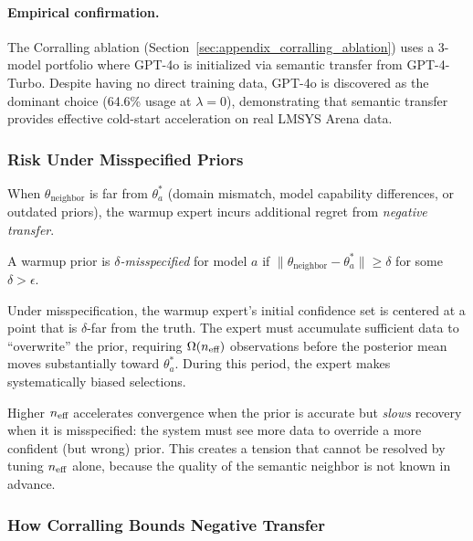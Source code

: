\paragraph{Empirical confirmation.}
The Corralling ablation (Section~\ref{sec:appendix_corralling_ablation}) uses
a 3-model portfolio where GPT-4o is initialized via semantic transfer from
GPT-4-Turbo.  Despite having no direct training data, GPT-4o is discovered as
the dominant choice (64.6\% usage at $\lambda=0$), demonstrating that semantic
transfer provides effective cold-start acceleration on real LMSYS Arena data.

\subsubsection{Risk Under Misspecified Priors}

When $\theta_{\text{neighbor}}$ is far from $\theta_a^*$ (domain mismatch,
model capability differences, or outdated priors), the warmup expert incurs
additional regret from \emph{negative transfer}.

\begin{definition}
\label{def:misspecification}
A warmup prior is \emph{$\delta$-misspecified} for model $a$ if
$\|\theta_{\text{neighbor}} - \theta_a^*\| \geq \delta$ for some $\delta > \epsilon$.
\end{definition}

Under misspecification, the warmup expert's initial confidence set is centered
at a point that is $\delta$-far from the truth.  The expert must accumulate
sufficient data to ``overwrite'' the prior, requiring $\Omega(n_{\text{eff}})$
observations before the posterior mean moves substantially toward $\theta_a^*$.
During this period, the expert makes systematically biased selections.

\begin{remark}
\label{remark:neff_dilemma}
Higher $n_{\text{eff}}$ accelerates convergence when the prior is accurate but
\emph{slows} recovery when it is misspecified: the system must see more data to
override a more confident (but wrong) prior.  This creates a tension that
cannot be resolved by tuning $n_{\text{eff}}$ alone, because the quality of the
semantic neighbor is not known in advance.
\end{remark}

\subsubsection{How Corralling Bounds Negative Transfer}

